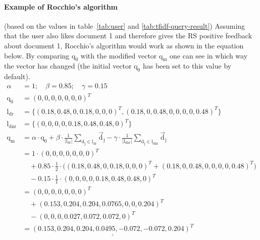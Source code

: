 \paragraph{Example of Rocchio's algorithm}
(based on the values in table~\ref{tab:user} and \ref{tab:tfidf-query-result})
Assuming that the user also likes document 1 and therefore gives the RS positive feedback about document 1, Rocchio's algorithm would work as shown in the equation below.
By comparing $\text{q}_0$ with the modified vector $\text{q}_\text{m}$ one can see in which way the vector has changed (the initial vector $\text{q}_0$ has been set to this value by default).
\begin{align*}
    \alpha &= 1;\quad \beta = 0.85;\quad \gamma = 0.15\\
    \text{q}_0 &= (0, 0, 0, 0, 0, 0, 0)^T \\
    \text{l}_\text{dr} &= \{(0.18, 0.48, 0, 0.18, 0, 0, 0)^T, (0.18, 0, 0.48, 0, 0, 0, 0, 0.48)^T\}\\
    \text{l}_\text{dnr} &= \{(0, 0, 0, 0, 0.18, 0.48, 0.48, 0)^T\}\\
    \text{q}_\text{m} &=
        \alpha \cdot \text{q}_0
        + \beta \cdot \frac{1}{|\text{l}_\text{dr}|}\sum_{\text{d}_\text{j}\in\text{l}_\text{dr}}\vec{\text{d}}_\text{j}
        - \gamma \cdot \frac{1}{|\text{l}_\text{dnr}|}\sum_{\text{d}_\text{j}\in\text{l}_\text{dnr}}\vec{\text{d}}_\text{j}\\
    &= 1 \cdot (0, 0, 0, 0, 0, 0, 0)^T\\
        &\quad+ 0.85 \cdot \frac{1}{2} \cdot \big((0.18, 0.48, 0, 0.18, 0, 0, 0)^T+(0.18, 0, 0.48, 0, 0, 0, 0, 0.48)^T \big)\\
        &\quad- 0.15 \cdot \frac{1}{1} \cdot(0, 0, 0, 0, 0.18, 0.48, 0.48, 0)^T\\
    &= (0, 0, 0, 0, 0, 0, 0)^T\\
        &\quad+(0.153, 0.204, 0.204, 0.0765, 0, 0, 0.204)^T\\
        &\quad-(0, 0, 0, 0.027, 0.072, 0.072, 0)^T\\
    &= \underline{\underline{
            (0.153, 0.204, 0.204, 0.0495, -0.072, -0.072, 0.204)^T
        }}
\end{align*}
